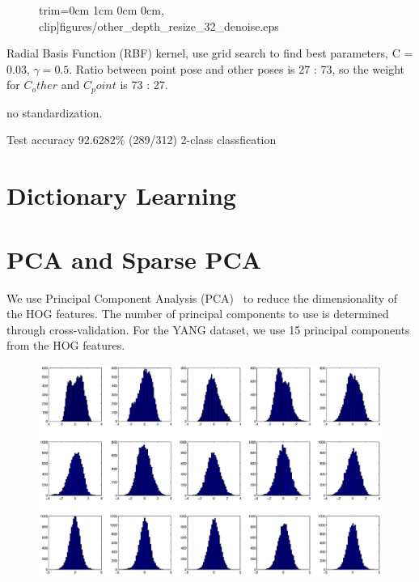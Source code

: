 \begin{figure}
{  trim={0cm 1cm 0cm 0cm}, clip]{figures/other_depth_resize_32_denoise.eps} }
\end{figure}

Radial Basis Function (RBF) kernel, use grid search to find best parameters, C =
0.03, $\gamma = 0.5$. Ratio between point pose and other poses is 27 : 73, so
the weight for $C_other$ and $C_point$ is 73 : 27. 

no standardization.

Test accuracy 92.6282\% (289/312) 2-class classfication


\section{Dictionary Learning}

\section{PCA and Sparse PCA}
We use Principal Component Analysis (PCA)~\cite{pca} to reduce the
dimensionality of the HOG features. The number of principal components to use
is determined through cross-validation. For the YANG dataset, we use 15
principal components from the HOG features.

\begin{figure}[t]
\includegraphics[width=\columnwidth]{figures/hist_pca.eps}
\end{figure}